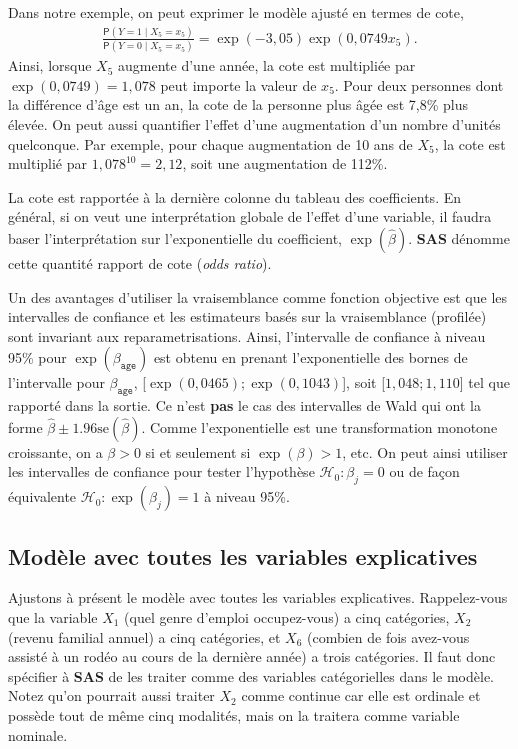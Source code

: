 \documentclass[
  11pt,
  letterpaper,
]{book}
\theoremstyle{definition}
\theoremstyle{definition}
\theoremstyle{definition}
\theoremstyle{remark}
\begin{document}
Dans notre exemple, on peut exprimer le modèle ajusté en termes de cote,
\begin{align*}
 \frac{{\mathsf P}\left(Y=1 \mid X_5=x_5\right)}{{\mathsf P}\left(Y=0 \mid X_5=x_5\right)} = \exp(-3,05)\exp(0,0749x_5).
\end{align*}
Ainsi, lorsque \(X_5\) augmente d'une année, la cote est multipliée par \(\exp(0,0749) = 1,078\) peut importe la valeur de \(x_5\). Pour deux personnes dont la différence d'âge est un an, la cote de la personne plus âgée est 7,8\% plus élevée. On peut aussi quantifier l'effet d'une augmentation d'un nombre d'unités quelconque. Par exemple, pour chaque augmentation de 10 ans de \(X_5\), la cote est multiplié par \(1,078^{10} = 2,12\), soit une augmentation de 112\%.

La cote est rapportée à la dernière colonne du tableau des coefficients. En général, si on veut une interprétation globale de l'effet d'une variable, il faudra baser l'interprétation sur l'exponentielle du coefficient, \(\exp(\widehat{\beta})\). \textbf{SAS} dénomme cette quantité rapport de cote (\emph{odds ratio}).

Un des avantages d'utiliser la vraisemblance comme fonction objective est que les intervalles de confiance et les estimateurs basés sur la vraisemblance (profilée) sont invariant aux reparametrisations. Ainsi, l'intervalle de confiance à niveau 95\% pour \(\exp(\beta_{\texttt{age}})\) est obtenu en prenant l'exponentielle des bornes de l'intervalle pour \(\beta_{\texttt{age}}\), {[}\(\exp(0,0465); \exp(0,1043)\){]}, soit {[}\(1,048; 1,110\){]} tel que rapporté dans la sortie. Ce n'est \textbf{pas} le cas des intervalles de Wald qui ont la forme \(\widehat{\beta} \pm 1.96 \mathrm{se}(\widehat{\beta})\).
Comme l'exponentielle est une transformation monotone croissante, on a \(\beta>0\) si et seulement si \(\exp(\beta)>1\), etc. On peut ainsi utiliser les intervalles de confiance pour tester l'hypothèse \(\mathcal{H}_0: \beta_j=0\) ou de façon équivalente \(\mathcal{H}_0: \exp(\beta_j)=1\) à niveau 95\%.

\hypertarget{moduxe8le-avec-toutes-les-variables-explicatives}{%
\subsection{Modèle avec toutes les variables explicatives}\label{moduxe8le-avec-toutes-les-variables-explicatives}}

Ajustons à présent le modèle avec toutes les variables explicatives. Rappelez-vous que la variable \(X_1\) (quel genre d'emploi occupez-vous) a cinq catégories, \(X_2\) (revenu familial annuel) a cinq catégories, et \(X_6\) (combien de fois avez-vous assisté à un rodéo au cours de la dernière année) a trois catégories. Il faut donc spécifier à \textbf{SAS} de les traiter comme des variables catégorielles dans le modèle. Notez qu'on pourrait aussi traiter \(X_2\) comme continue car elle est ordinale et possède tout de même cinq modalités, mais on la traitera comme variable nominale.
\end{document}
